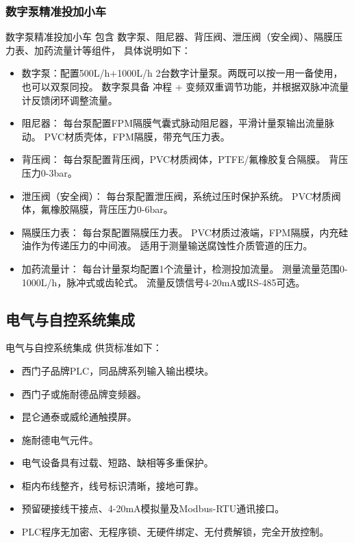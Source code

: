 \documentclass[UTF8,a4paper,12pt,titlepage]{ctexart}
\begin{document}
        \subsubsection{数字泵精准投加小车}
           数字泵精准投加小车 包含 数字泵、阻尼器、背压阀、泄压阀（安全阀）、隔膜压力表、加药流量计等组件， 
           具体说明如下：
        \begin{itemize}
            \item 数字泵：配置500L/h+1000L/h 2台数字计量泵。两既可以按一用一备使用，也可以双泵同投。
                数字泵具备 冲程 + 变频双重调节功能，并根据双脉冲流量计反馈闭环调整流量。
            \item 阻尼器：
            每台泵配置FPM隔膜气囊式脉动阻尼器，平滑计量泵输出流量脉动。 PVC材质壳体，FPM隔膜，带充气压力表。
            \item 背压阀：
            每台泵配置背压阀，PVC材质阀体，PTFE/氟橡胶复合隔膜。 背压压力0-3bar。
            \item 泄压阀（安全阀）：
            每台泵配置泄压阀，系统过压时保护系统。 PVC材质阀体，氟橡胶隔膜，背压压力0-6bar。
            \item 隔膜压力表：
            每台泵配置隔膜压力表。 PVC材质过液端，FPM隔膜，内充硅油作为传递压力的中间液。 适用于测量输送腐蚀性介质管道的压力。
            \item 加药流量计：
            每台计量泵均配置1个流量计，检测投加流量。 
            测量流量范围0-1000L/h，脉冲式或齿轮式。
            流量反馈信号4-20mA或RS-485可选。
        \end{itemize}

    \subsection{ 电气与自控系统集成}
        电气与自控系统集成 供货标准如下：
        \begin{itemize}
            \item 西门子品牌PLC，同品牌系列输入输出模块。
            \item 西门子或施耐德品牌变频器。
            \item 昆仑通泰或威纶通触摸屏。
            \item 施耐德电气元件。
            \item 电气设备具有过载、短路、缺相等多重保护。
            \item 柜内布线整齐，线号标识清晰，接地可靠。
            \item 预留硬接线干接点、4-20mA模拟量及Modbus-RTU通讯接口。
            \item PLC程序无加密、无程序锁、无硬件绑定、无付费解锁，完全开放控制。
        \end{itemize}
\end{document}
